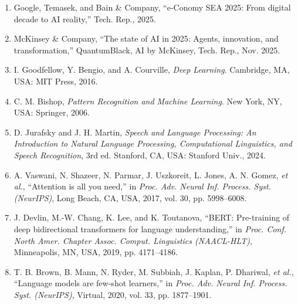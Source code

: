 %
%
\begin{enumerate}
\def\labelenumi{[\arabic{enumi}]}

\item\label{ref:economy2025}
  Google, Temasek, and Bain \& Company, ``e-Conomy SEA 2025: From digital
  decade to AI reality,'' Tech. Rep., 2025.

\item\label{ref:mckinsey2025}
  McKinsey \& Company, ``The state of AI in 2025: Agents, innovation, and
  transformation,'' QuantumBlack, AI by McKinsey, Tech. Rep., Nov. 2025.

\item\label{ref:goodfellow2016}
  I. Goodfellow, Y. Bengio, and A. Courville, \emph{Deep Learning}.
  Cambridge, MA, USA: MIT Press, 2016.

\item\label{ref:bishop2006}
  C. M. Bishop, \emph{Pattern Recognition and Machine Learning}.
  New York, NY, USA: Springer, 2006.

\item\label{ref:jurafsky2024}
  D. Jurafsky and J. H. Martin, \emph{Speech and Language Processing: An
  Introduction to Natural Language Processing, Computational Linguistics,
  and Speech Recognition}, 3rd ed. Stanford, CA, USA: Stanford Univ., 2024.

\item\label{ref:vaswani2017}
  A. Vaswani, N. Shazeer, N. Parmar, J. Uszkoreit, L. Jones, A. N. Gomez,
  \emph{et al.}, ``Attention is all you need,'' in \emph{Proc. Adv. Neural
  Inf. Process. Syst. (NeurIPS)}, Long Beach, CA, USA, 2017, vol. 30,
  pp. 5998--6008.

\item\label{ref:devlin2019}
  J. Devlin, M.-W. Chang, K. Lee, and K. Toutanova, ``BERT: Pre-training of
  deep bidirectional transformers for language understanding,'' in
  \emph{Proc. Conf. North Amer. Chapter Assoc. Comput. Linguistics
  (NAACL-HLT)}, Minneapolis, MN, USA, 2019, pp. 4171--4186.

\item\label{ref:brown2020}
  T. B. Brown, B. Mann, N. Ryder, M. Subbiah, J. Kaplan, P. Dhariwal,
  \emph{et al.}, ``Language models are few-shot learners,'' in \emph{Proc.
  Adv. Neural Inf. Process. Syst. (NeurIPS)}, Virtual, 2020, vol. 33,
  pp. 1877--1901.


\end{enumerate}
